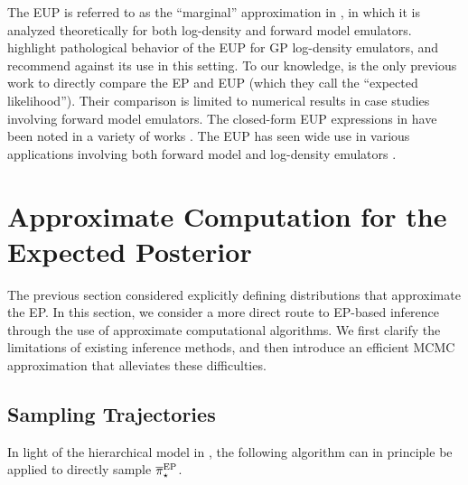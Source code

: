 \documentclass[12pt]{article}
\begin{document}
The EUP is referred to as the ``marginal'' approximation in 
\citet{StuartTeck1,StuartTeck2,random_fwd_models,TeckHyperpar},
in which it is analyzed theoretically for both log-density and forward 
model emulators. \citet{VehtariParallelGP} highlight pathological 
behavior of the EUP for GP log-density emulators, and recommend 
against its use in this setting. To our knowledge, \citet{BurknerSurrogate}
is the only previous work to directly compare the EP and EUP (which 
they call the ``expected likelihood''). Their comparison is limited to 
numerical results in case studies involving forward model emulators.
The closed-form EUP expressions in 
 have been 
noted in a variety of works 
\citep{StuartTeck1,StuartTeck2,VehtariParallelGP,weightedIVAR,
GP_PDE_priors,Surer2023sequential,Takhtaganov2018AdaptiveBayesianGP}. 
The EUP has seen wide 
use in various applications involving both forward model 
and log-density emulators 
\citep{weightedIVAR,GP_PDE_priors,CES,idealizedGCM,
villani2024posteriorsamplingadaptivegaussian,hydrologicalModel,hydrologicalModel2}.
 
\section{Approximate Computation for the Expected Posterior} \label{sec:computation}
The previous section considered explicitly defining distributions that approximate the EP.
In this section, we consider a more direct route to EP-based inference through
the use of approximate computational algorithms. 
We first clarify the limitations of existing inference methods, 
and then introduce an efficient MCMC approximation that alleviates 
these difficulties.

\subsection{Sampling Trajectories}
In light of the hierarchical model in , the following 
algorithm can in principle be applied to directly sample ${\overline{\pi}}_{\star}^{\mathrm{EP}}$.  
\end{document}
